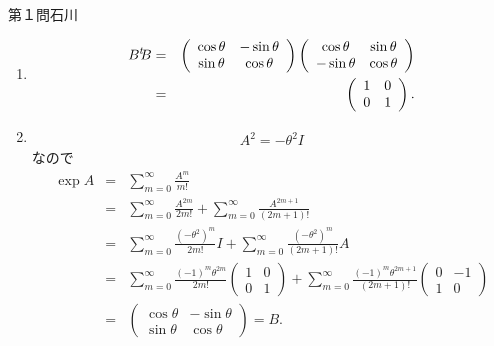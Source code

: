\newcommand{\tr}[1]{{}^t\hspace{-1mm}#1}
\newcommand{\pdif}[2]{\frac{\partial #1}{\partial #2}}

\begin{answer}{第１問}{石川}
\begin{enumerate}
\item
  \begin{eqnarray}
  B\tr{B} &=& 
  \left(
    \begin{array}{cc}
     \cos\theta & -\sin\theta \\
     \sin\theta  & \cos\theta 
    \end{array}
   \right)
   \left(
    \begin{array}{cc}
     \cos\theta & \sin\theta \\
     -\sin\theta  & \cos\theta 
    \end{array}
   \right)\\
   &=&
   \left(
    \begin{array}{cc}
     1 & 0 \\
     0  & 1 
    \end{array}
   \right).
  \end{eqnarray}

\item
  \begin{eqnarray}
    A^2 = -\theta^2 I
  \end{eqnarray}
  なので
  \begin{eqnarray}
    \exp{A}
      &=& \sum^{\infty}_{m=0}\frac{A^m}{m!}\\
      &=& \sum^{\infty}_{m=0}\frac{A^{2m}}{2m!}+\sum^{\infty}_{m=0}\frac{A^{2m+1}}{(2m+1)!}\\
      &=& \sum^{\infty}_{m=0}\frac{(-\theta^2)^{m}}{2m!}I+\sum^{\infty}_{m=0}\frac{(-\theta^2)^m}{(2m+1)!}A\\
      &=& \sum^{\infty}_{m=0}\frac{(-1)^m\theta^{2m}}{2m!}
        \left(
          \begin{array}{cc}
           1 & 0 \\
           0 & 1 
          \end{array}
        \right)
        +\sum^{\infty}_{m=0}\frac{(-1)^m\theta^{2m+1}}{(2m+1)!}
        \left(
          \begin{array}{cc}
           0 & -1 \\
           1 & 0 
          \end{array}
        \right)\\
      &=& 
        \left(
          \begin{array}{cc}
           \cos\theta & -\sin\theta \\
           \sin\theta  & \cos\theta 
          \end{array}
        \right) = B.
  \end{eqnarray}


\end{enumerate}
\end{answer}
